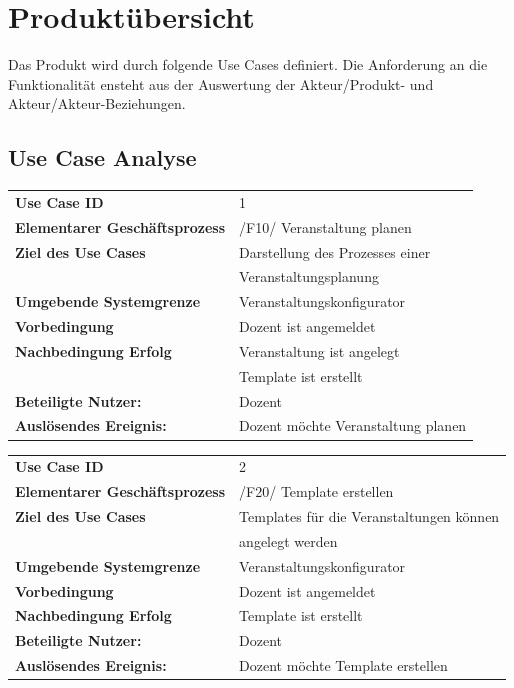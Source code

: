 		
		
		
		
	\section{Produktübersicht}
	
	Das Produkt wird durch folgende Use Cases definiert. Die Anforderung an die Funktionalität ensteht aus der Auswertung der Akteur/Produkt- und Akteur/Akteur-Beziehungen.
	
	\subsection{Use Case Analyse}
	
	\begin{table}[ht!]
	\begin{tabular}{ll}
	 \textbf{Use Case ID} & 1 \\
 	 \textbf{Elementarer Geschäftsprozess} & /F10/ Veranstaltung planen \\ 
	 \textbf{Ziel des Use Cases} & Darstellung des  Prozesses einer    \\
	 & Veranstaltungsplanung\\ 
	 \textbf{Umgebende Systemgrenze}& Veranstaltungskonfigurator \\ 
	 \textbf{Vorbedingung} & Dozent ist angemeldet \\ 
	 \textbf{Nachbedingung Erfolg} & Veranstaltung ist angelegt \\ 
	 & Template ist erstellt\\
	 \textbf{Beteiligte Nutzer:} & Dozent \\ 
     \textbf{Auslösendes Ereignis:} & Dozent möchte Veranstaltung planen \\ 
	 
	\end{tabular} 
	\label{tab:usecase_1}
	\end{table}
	
		\begin{table}[ht!]
		\begin{tabular}{ll}
		 \textbf{Use Case ID} & 2 \\
	 	 \textbf{Elementarer Geschäftsprozess} & /F20/ Template erstellen \\ 
		 \textbf{Ziel des Use Cases} & Templates für die Veranstaltungen können \\& angelegt werden   \\
		 \textbf{Umgebende Systemgrenze}& Veranstaltungskonfigurator \\ 
		 \textbf{Vorbedingung} & Dozent ist angemeldet \\ 
		 \textbf{Nachbedingung Erfolg} & Template ist erstellt \\ 
		 \textbf{Beteiligte Nutzer:} & Dozent \\ 
	     \textbf{Auslösendes Ereignis:} & Dozent möchte Template erstellen \\ 
		 
		\end{tabular} 
		\label{tab:usecase_2}
		\end{table}
	
